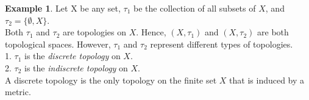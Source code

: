 \documentclass[12pt, reqno]{amsart}
\theoremstyle{definition}
\newtheorem{example}[theorem]{Example}
\numberwithin{equation}{section}
\newcommand{\dR}{{\mathbb R}}
\begin{document}
\begin{comment}
\begin{example} [The line with two origins] \hfill \\
    Let $\dR \cup \{z\}$ and\\
    (1) $\tau_1 = \{U \subseteq \dR | U$ is open with Euclidean metric\}\\
    (2) $\tau_2 = \{\emptyset\} \cup \{W=V \cup \{z\}| V \in \tau_1$ such that $\{0\} \notin V\}$.
    (3) $\tau = \tau_1 \cup \tau_2$. That is there exists an element in $\tau$ that is a union $U \cup W$. This is a topology in $X$ because $\emptyset, X \in \tau$ and $\tau$ is closed under union and intersection.\\
    This topology has the property: if $A, B \in \tau$ such that\\
    (i) $0 \in A, z \notin A$; and\\
    (ii) $x \in B, 0 \notin B$,\\
    then $A \cap B \neq \emptyset$.\\
    Therefore, it is impossible to separate 0 from $z$.
\end{example}

\end{comment}

\begin{comment}
    \begin{example}
    Let's consider the same set $X$ with a different $\tau$, say $\tau_0$.\\
    We have $X=\{1,2,3\}$ and $\tau_0=\{\emptyset, X, \{2\}, \{3\}\}$\\
    (1): We can see that $\emptyset, X \in \tau_0$.\\
    (2): $\{2\} \cup \{3\} = \{2,3\} \notin \tau_0$.\\
    Thus, $\tau_0$ is not a topology. Hence, the pair $(X, \tau_0)$ is not a topological space.
\end{example}

\end{comment}
\begin{example}
    Let X be any set, $\tau_1$ be the collection of all subsets of $X$, and $\tau_2 = \{\emptyset, X\}$.\\
    Both $\tau_1$ and $\tau_2$ are topologies on $X$. Hence, $(X, \tau_1)$ and $(X, \tau_2)$ are both topological spaces. However, $\tau_1$ and $\tau_2$ represent different types of topologies.\\
    1. $\tau_1$ is the \textit{discrete topology} on $X$.\\
    2. $\tau_2$ is the \textit{indiscrete topology} on $X$.\\
A discrete topology is the only topology on the finite set $X$ that is induced by a metric.
\end{example}
\end{document}
